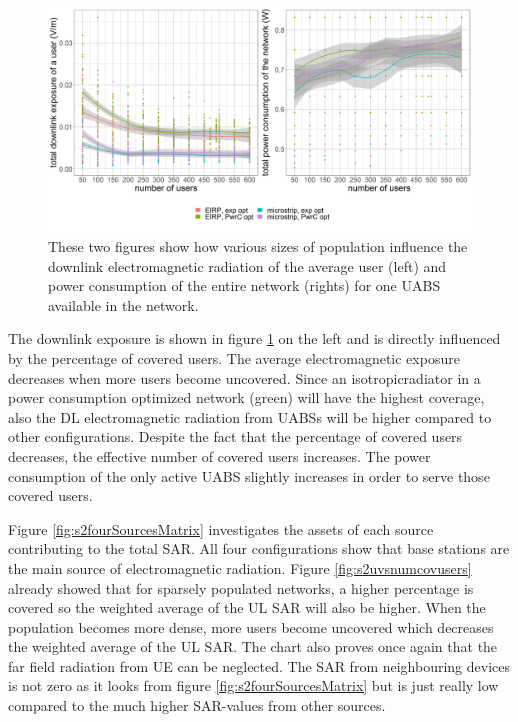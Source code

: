 \begin{figure}[h!]
  \includegraphics[width=\textwidth]{../results/s2/uvsdlAndPc.png}
  \caption{These two figures show how various sizes of population influence the downlink electromagnetic radiation of the average user (left) and 
  power consumption of the entire network (rights) for one \gls{UABS} available in the network.}
  \label{fig:s2b_dlAndPc}
\end{figure}

The downlink exposure is shown in figure \ref{fig:s2b_dlAndPc} on the left and is directly influenced by the percentage of covered users. 
The average electromagnetic exposure decreases when more users become uncovered. Since an \gls{isotropicradiator} in a power consumption optimized network (green)
will have the highest coverage, also the \gls{DL} electromagnetic radiation from \gls{UABS}s will be higher compared to other configurations.
Despite the fact that the percentage of covered users decreases, the effective number of covered users increases. The power consumption of the only 
active \gls{UABS} slightly increases in order to serve those covered users.


Figure \ref{fig:s2fourSourcesMatrix} investigates the assets of each source contributing to the total \gls{SAR}. All four 
configurations show that base stations are the main source of electromagnetic radiation.
Figure \ref{fig:s2uvsnumcovusers} already 
showed that for sparsely populated networks, a higher percentage is covered so the weighted average of the \gls{UL} \gls{SAR} will also be higher. 
When the population becomes more dense,
more users become uncovered which decreases the weighted average of the \gls{UL} \gls{SAR}.
The chart also proves once again that the far field radiation from \gls{UE} can be neglected. The \gls{SAR} from 
neighbouring devices is not zero as it looks from figure \ref{fig:s2fourSourcesMatrix} but is just really low compared to the much higher
\gls{SAR}-values from other sources.

